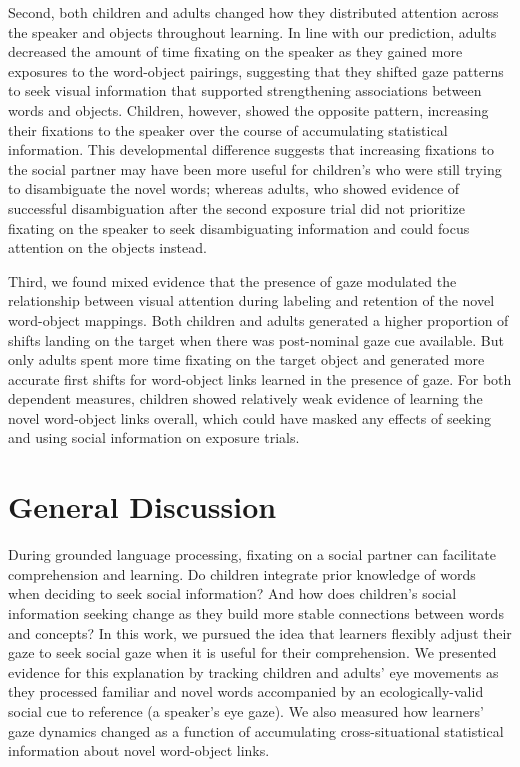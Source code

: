 \documentclass[man,floatsintext]{apa6}
\begin{document}
Second, both children and adults changed how they distributed attention
across the speaker and objects throughout learning. In line with our
prediction, adults decreased the amount of time fixating on the speaker
as they gained more exposures to the word-object pairings, suggesting
that they shifted gaze patterns to seek visual information that
supported strengthening associations between words and objects.
Children, however, showed the opposite pattern, increasing their
fixations to the speaker over the course of accumulating statistical
information. This developmental difference suggests that increasing
fixations to the social partner may have been more useful for children's
who were still trying to disambiguate the novel words; whereas adults,
who showed evidence of successful disambiguation after the second
exposure trial did not prioritize fixating on the speaker to seek
disambiguating information and could focus attention on the objects
instead.

Third, we found mixed evidence that the presence of gaze modulated the
relationship between visual attention during labeling and retention of
the novel word-object mappings. Both children and adults generated a
higher proportion of shifts landing on the target when there was
post-nominal gaze cue available. But only adults spent more time
fixating on the target object and generated more accurate first shifts
for word-object links learned in the presence of gaze. For both
dependent measures, children showed relatively weak evidence of learning
the novel word-object links overall, which could have masked any effects
of seeking and using social information on exposure trials.

\section{General Discussion}\label{general-discussion}

During grounded language processing, fixating on a social partner can
facilitate comprehension and learning. Do children integrate prior
knowledge of words when deciding to seek social information? And how
does children's social information seeking change as they build more
stable connections between words and concepts? In this work, we pursued
the idea that learners flexibly adjust their gaze to seek social gaze
when it is useful for their comprehension. We presented evidence for
this explanation by tracking children and adults' eye movements as they
processed familiar and novel words accompanied by an ecologically-valid
social cue to reference (a speaker's eye gaze). We also measured how
learners' gaze dynamics changed as a function of accumulating
cross-situational statistical information about novel word-object links.
\end{document}
